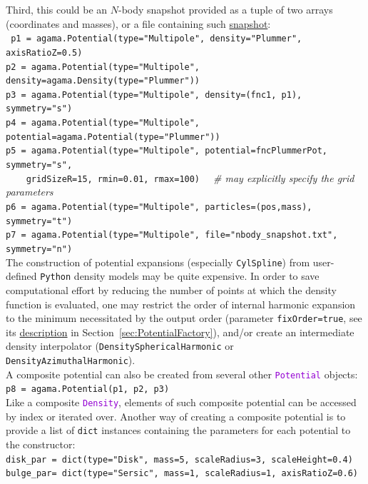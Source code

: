 \documentclass[12pt]{article}
\newcommand{\Python}{\texttt{Python}\xspace}
\newcommand{\ttt}[1]{\textcolor{darkviolet}{\texttt{#1}}}
\newcommand{\ppp}[1]{\textcolor{darkolive} {\texttt{#1}}}
\begin{document}
Third, this could be an $N$-body snapshot provided as a tuple of two arrays (coordinates and masses), or a file containing such \hyperref[sec:PythonSnapshot]{snapshot}:\\
\texttt{%
p1 = agama.Potential(type="Multipole", density="Plummer", axisRatioZ=0.5)\\
p2 = agama.Potential(type="Multipole", density=agama.Density(type="Plummer"))\\
p3 = agama.Potential(type="Multipole", density=(fnc1, p1), symmetry="s")\\
p4 = agama.Potential(type="Multipole", potential=agama.Potential(type="Plummer"))\\
p5 = agama.Potential(type="Multipole", potential=fncPlummerPot, symmetry="s", \\
\mbox{}~~~~gridSizeR=15, rmin=0.01, rmax=100)} \textit{\color{Sepia} \ \ \# may explicitly specify the grid parameters}\\
\texttt{p6 = agama.Potential(type="Multipole", particles=(pos,mass), symmetry="t")}\\
\texttt{p7 = agama.Potential(type="Multipole", file="nbody_snapshot.txt", symmetry="n")}\\[2mm]
The construction of potential expansions (especially \ppp{CylSpline}) from user-defined \Python density models may be quite expensive. In order to save computational effort by reducing the number of points at which the density function is evaluated, one may restrict the order of internal harmonic expansion to the minimum necessitated by the output order (parameter \ppp{fixOrder=true}, see its \hyperref[sec:PotentialExpansionParams]{description} in Section~\ref{sec:PotentialFactory}), and/or create an intermediate density interpolator (\ppp{DensitySphericalHarmonic} or \ppp{DensityAzimuthalHarmonic}).
\\[2mm]
A composite potential can also be created from several other \ttt{Potential} objects:\\
\texttt{p8 = agama.Potential(p1, p2, p3)}\\[2mm]
Like a composite \ttt{Density}, elements of such composite potential can be accessed by index or iterated over.
Another way of creating a composite potential is to provide a list of \texttt{dict} instances containing the parameters for each potential to the constructor:\\
\texttt{disk_par = dict(type="Disk", mass=5, scaleRadius=3, scaleHeight=0.4)}\\
\texttt{bulge_par= dict(type="Sersic", mass=1, scaleRadius=1, axisRatioZ=0.6)}\\
\end{document}
